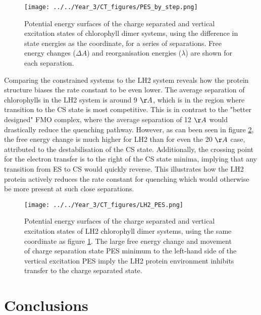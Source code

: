 \begin{figure}
    \centering
    \texttt{[image: ../../Year\_3/CT\_figures/PES\_by\_step.png]}
    \label{fig:ct_pes_distance}
    \caption{Potential energy surfaces of the charge separated and vertical excitation
    states of chlorophyll dimer systems, using the difference in state energies 
    as the coordinate, for a series of separations. Free energy changes ($\Delta A$)
    and reorganisation energies ($\lambda$) are shown for each separation.}
\end{figure}

Comparing the constrained systems to the LH2 system reveals how the protein structure
biases the rate constant to be even lower. The average separation of chlorophylls
in the LH2 system is around 9 $\AA{}$, which is in the region where transition to
the CS state is most competitive. This is in contrast to the "better designed" FMO
complex, where the average separation of 12 $\AA{}$ would drastically reduce the
quenching pathway. However, as can been seen in figure \ref{fig:ct_pes_lh2}, the
free energy change is much higher for LH2 than for even the 20 $\AA{}$ case, attributed
to the destabilisation of the CS state. Additionally, the crossing point for the
electron transfer is to the right of the CS state minima, implying that any transition
from ES to CS would quickly reverse. This illustrates how the LH2 protein actively 
reduces the rate constant for quenching which would otherwise be more present at 
such close separations.

\begin{figure}
    \centering
    \texttt{[image: ../../Year\_3/CT\_figures/LH2\_PES.png]}
    \label{fig:ct_pes_lh2}
    \caption{Potential energy surfaces of the charge separated and vertical excitation
    states of LH2 chlorophyll dimer systems, using the same coordinate as figure
    \ref{fig:ct_pes_distance}. The large free energy change and movement of charge
    separation state PES minimum to the left-hand side of the vertical excitation 
    PES imply the LH2 protein environment inhibits transfer to the charge separated
    state.}
\end{figure}

\section{Conclusions}
\label{sec:exciton_concs}

